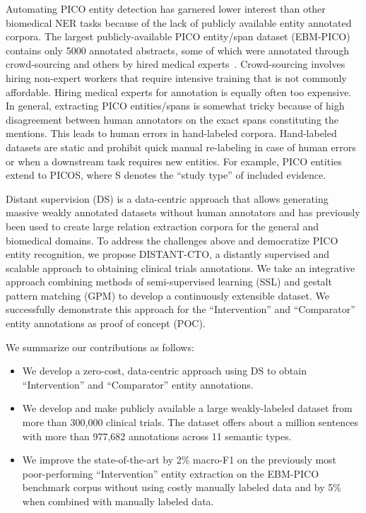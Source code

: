 \documentclass[11pt]{article}
\begin{document}
Automating PICO entity detection has garnered lower interest than other biomedical NER tasks because of the lack of publicly available entity annotated corpora.
The largest publicly-available PICO entity/span dataset (EBM-PICO) contains only 5000 annotated abstracts, some of which were annotated through crowd-sourcing and others by hired medical experts~\cite{nye2018corpus}.
Crowd-sourcing involves hiring non-expert workers that require intensive training that is not commonly affordable.
Hiring medical experts for annotation is equally often too expensive.
In general, extracting PICO entities/spans is somewhat tricky because of high disagreement between human annotators on the exact spans constituting the mentions.
This leads to human errors in hand-labeled corpora.
Hand-labeled datasets are static and prohibit quick manual re-labeling in case of human errors or when a downstream task requires new entities.
For example, PICO entities extend to PICOS, where S denotes the ``study type'' of included evidence.

Distant supervision (DS) is a data-centric approach that allows generating massive weakly annotated datasets without human annotators and has previously been used to create large relation extraction corpora for the general and biomedical domains.
To address the challenges above and democratize PICO entity recognition, we propose DISTANT-CTO, a distantly supervised and scalable approach to obtaining clinical trials annotations.
We take an integrative approach combining methods of semi-supervised learning (SSL) and gestalt pattern matching (GPM) to develop a continuously extensible dataset.
We successfully demonstrate this approach for the ``Intervention'' and ``Comparator'' entity annotations as proof of concept (POC).


We summarize our contributions as follows:
%
\begin{itemize}
    \item We develop a zero-cost, data-centric approach using DS to obtain ``Intervention'' and ``Comparator'' entity annotations.
    \item We develop and make publicly available a large weakly-labeled dataset from more than 300,000 clinical trials. The dataset offers about a million sentences with more than 977,682 annotations across 11 semantic types.
    \item We improve the state-of-the-art by 2\% macro-F1 on the previously most poor-performing ``Intervention'' entity extraction on the EBM-PICO benchmark corpus without using costly manually labeled data and by 5\% when combined with manually labeled data.
\end{itemize}
%
%
%
\end{document}
